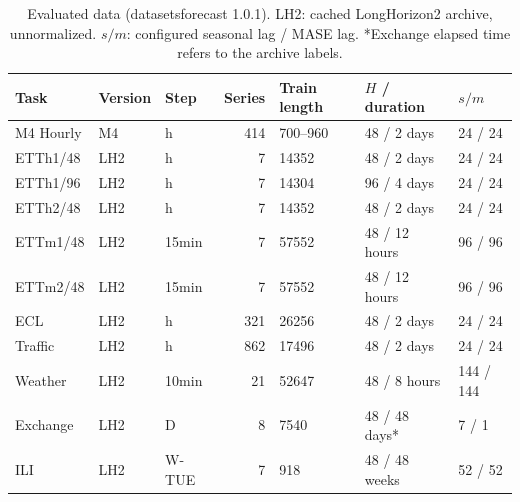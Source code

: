 \begin{table}[!htbp]
\centering
\caption{Evaluated data (datasetsforecast 1.0.1). LH2: cached LongHorizon2 archive, unnormalized. $s/m$: configured seasonal lag / MASE lag. *Exchange elapsed time refers to the archive labels.}
\label{tab:datasets}
\small
\setlength{\tabcolsep}{3.5pt}
\begin{tabular}{lllrlll}
\hline
Task & Version & Step & Series & Train length & $H$ / duration & $s/m$ \\
\hline
M4 Hourly & M4 & h & 414 & 700--960 & 48 / 2 days & 24 / 24 \\
ETTh1/48 & LH2 & h & 7 & 14352 & 48 / 2 days & 24 / 24 \\
ETTh1/96 & LH2 & h & 7 & 14304 & 96 / 4 days & 24 / 24 \\
ETTh2/48 & LH2 & h & 7 & 14352 & 48 / 2 days & 24 / 24 \\
ETTm1/48 & LH2 & 15min & 7 & 57552 & 48 / 12 hours & 96 / 96 \\
ETTm2/48 & LH2 & 15min & 7 & 57552 & 48 / 12 hours & 96 / 96 \\
ECL & LH2 & h & 321 & 26256 & 48 / 2 days & 24 / 24 \\
Traffic & LH2 & h & 862 & 17496 & 48 / 2 days & 24 / 24 \\
Weather & LH2 & 10min & 21 & 52647 & 48 / 8 hours & 144 / 144 \\
Exchange & LH2 & D & 8 & 7540 & 48 / 48 days* & 7 / 1 \\
ILI & LH2 & W-TUE & 7 & 918 & 48 / 48 weeks & 52 / 52 \\
\hline
\end{tabular}
\end{table}

